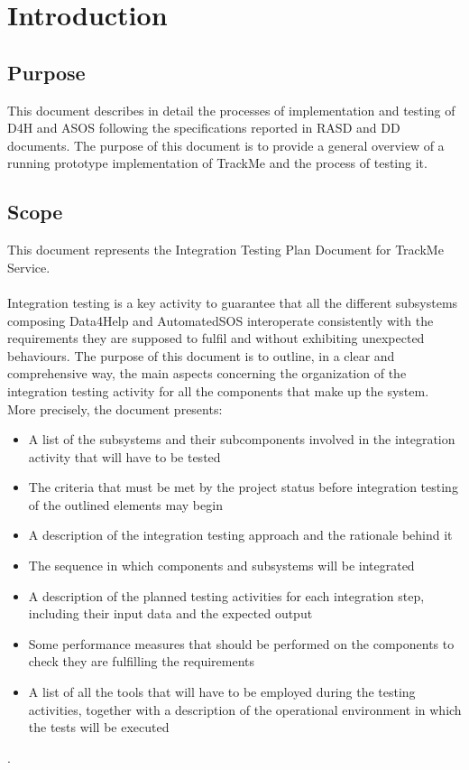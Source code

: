 \documentclass[a4paper, hidelinks, 12pt]{report}
\begin{document}
	\tableofcontents
	\newpage
	\listoffigures
	\listoftables
	\clearpage
	\setcounter{page}{1}
	
	\chapter{Introduction}
	\section{Purpose}
	This document describes in detail the processes of implementation and testing of D4H and ASOS following the specifications reported in RASD and DD documents. The purpose of this document is to provide a general overview of a running prototype implementation of TrackMe and the process of testing it.
	
	\section{Scope}
	This document represents the Integration Testing Plan Document for TrackMe Service. \\\\
	Integration testing is a key activity to guarantee that all the different subsystems composing Data4Help and AutomatedSOS interoperate consistently with the requirements they are supposed to fulfil and without exhibiting unexpected behaviours. The purpose of this document is to outline, in a clear and comprehensive way, the main aspects concerning the organization of the integration testing activity for all the components that make up the system.	\\	
	More precisely, the document presents:
	
\begin{itemize}
		\item{}A list of the subsystems and their subcomponents involved in the integration activity that will have to be tested
		\item{}The criteria that must be met by the project status before integration testing of the outlined elements may begin
		\item{}A description of the integration testing approach and the rationale behind it
		\item{}The sequence in which components and subsystems will be integrated
		\item{} A description of the planned testing activities for each integration step, including their input data and the expected output
		\item{}Some performance measures that should be performed on the components to check they are fulfilling the requirements
		\item{}A list of all the tools that will have to be employed during the testing activities, together with a description of the operational environment in which the tests will be executed
	\end{itemize}.
	
\end{document}
